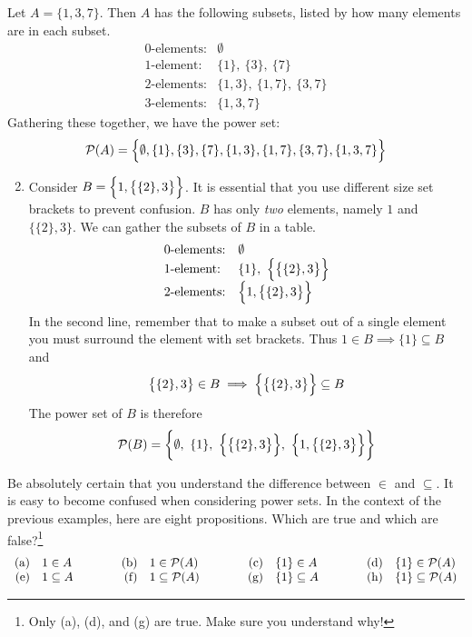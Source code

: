 \begin{examples}{}{}
	\exstart Let $A=\{1,3,7\}$. Then $A$ has the following subsets, listed by how many elements are in each subset.
	\[
		\begin{array}{ll}
			\text{0-elements:}&\emptyset\\
			\text{1-element:}&\{1\},\ \{3\},\ \{7\}\\
			\text{2-elements:}&\{1,3\},\ \{1,7\},\ \{3,7\}\\
			\text{3-elements:}&\{1,3,7\}
		\end{array}
	\]
	Gathering these together, we have the power set:
	\[
		\mathcal{P}(A)=\Bigl\{\emptyset,\{1\},\{3\},\{7\},\{1,3\},\{1,7\},\{3,7\},\{1,3,7\}\Bigr\}
	\]
	\begin{enumerate}\setcounter{enumi}{1}
	  \item Consider $B=\Bigl\{1,\bigl\{\{2\},3\bigr\}\Bigr\}$. It is essential that you use different size set brackets to prevent confusion. $B$ has only \emph{two} elements, namely $1$ and $\bigl\{\{2\},3\bigr\}$. We can gather the subsets of $B$ in a table.
		\[
			\begin{array}{ll}
				\text{0-elements:}&\emptyset\\
				\text{1-element:}&\{1\},\ \Bigl\{\bigl\{\{2\},3\bigr\}\Bigr\}\\
				\text{2-elements:}&\Bigl\{1,\bigl\{\{2\},3\bigr\}\Bigr\}
			\end{array}
		\]
		In the second line, remember that to make a subset out of a single element you must surround the element with set brackets. Thus $1\in B\implies \{1\}\subseteq B$ and
		\[
			\bigl\{\{2\},3\bigr\}\in B\implies \Bigl\{\bigl\{\{2\},3\bigr\}\Bigr\}\subseteq B
		\]
		The power set of $B$ is therefore
		\[
			\cP(B)=\biggl\{\emptyset,\ \{1\},\ \Bigl\{\bigl\{\{2\},3\bigr\}\Bigr\},\ \Bigl\{1,\bigl\{\{2\},3\bigr\}\Bigr\}\biggr\}
		\]
	\end{enumerate}
\end{examples}



Be absolutely certain that you understand the difference between $\in$ and $\subseteq$. It is easy to become confused when considering power sets. In the context of the previous examples, here are eight propositions. Which are true and which are false?\footnote{Only (a), (d), and (g) are true. Make sure you understand why!}
\[
	\begin{array}{r@{\quad}l@{\qquad\qquad}r@{\quad}l@{\qquad\qquad}r@{\quad}l@{\qquad\qquad}r@{\quad}l}
		\text{(a)}&1\in A
				&\text{(b)}&1\in\cP(A)
				&\text{(c)}&\{1\}\in A
				&\text{(d)}&\{1\}\in\cP(A)\\
		\text{(e)}&1\subseteq A
				&\text{(f)}&1\subseteq\cP(A)
				&\text{(g)}&\{1\}\subseteq A
				&\text{(h)}&\{1\}\subseteq\cP(A)
	\end{array}
\]

